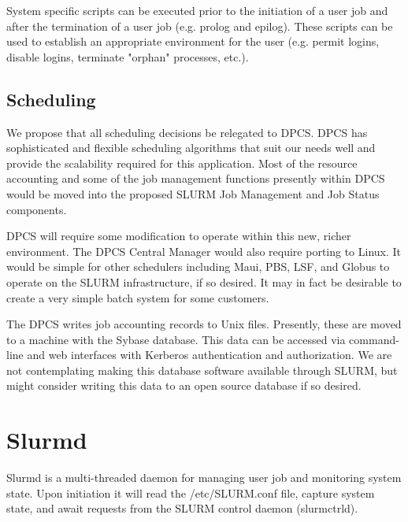 System specific scripts can be executed prior to the initiation of a user job
and after the termination of a user job (e.g. prolog and epilog). These scripts
can be used to establish an appropriate environment for the user (e.g. permit
logins, disable logins, terminate "orphan" processes, etc.). 

\subsection{Scheduling}

We propose that all scheduling decisions be relegated to DPCS. DPCS has
sophisticated and flexible scheduling algorithms that suit our needs well and
provide the scalability required for this application. Most of the resource
accounting and some of the job management functions presently within DPCS would
be moved into the proposed SLURM Job Management and Job Status components. 

DPCS will require some modification to operate within this new, richer
environment. The DPCS Central Manager would also require porting to Linux. It
would be simple for other schedulers including Maui, PBS, LSF, and Globus 
to operate on the SLURM infrastructure, if so desired. It may in fact be 
desirable to create a very simple batch system for some customers.

The DPCS writes job accounting records to Unix files. Presently, these are
moved to a machine with the Sybase database. This data can be accessed via
command-line and web interfaces with Kerberos authentication and authorization.
We are not contemplating making this database software available through SLURM,
but might consider writing this data to an open source database if so desired.

\section{Slurmd}

Slurmd is a multi-threaded daemon for managing user job and 
monitoring system state. 
Upon initiation it will read the /etc/SLURM.conf file, capture 
system state, and await requests from the SLURM control daemon 
(slurmctrld). 

